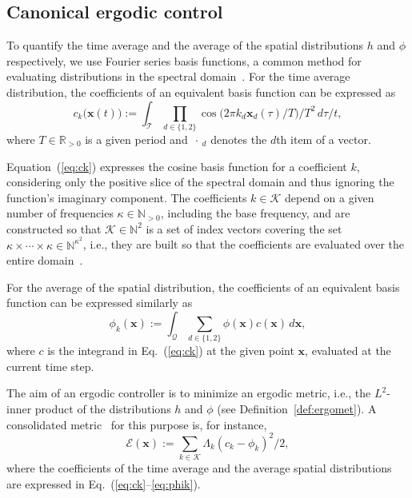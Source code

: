 \documentclass[letterpaper,10pt,conference,twoside]{IEEEtran}
\theoremstyle{definition}
\begin{document}
\subsection{Canonical ergodic control}
\label{sec:canon}
\noindent
To quantify the time average and the average of the spatial distributions $h$ and $\phi$ respectively, we use Fourier series basis functions, a common method for evaluating distributions in the spectral domain~\cite{mathew2011metrics}. For the time average distribution, the coefficients of an equivalent basis function can be expressed as
\begin{equation}\label{eq:ck}
  c_k\big(\mathbf{x}(t)\big):=\int_{\mathcal{T}}{\prod_{d\in\{1,2\}}}{\cos{\big(2\pi k_d\mathbf{x}_d(\tau)/T\big)}/T^2}\,d\tau/t,
\end{equation}
where $T\in\mathbb{R}_{>0}$ is a given period and $\,\cdot\,_d$ denotes the $d$th item of a vector.

Equation~(\ref{eq:ck}) expresses the cosine basis function for a coefficient $k$, considering only the positive slice of the spectral domain and thus ignoring the function's imaginary component. The coefficients $k\in\mathcal{K}$ depend on a given number of frequencies $\kappa\in\mathbb{N}_{>0}$, including the base frequency, and are constructed so that $\mathcal{K}\in\mathbb{N}^2$ is a set of index vectors covering the set $\kappa\times\cdots\times\kappa\in\mathbb{N}^{\kappa^2}$, i.e., they are built so that the coefficients are evaluated over the entire domain~\cite{calinon2020mixture}.

For the average of the spatial distribution, the coefficients of an equivalent basis function can be expressed similarly as 
\begin{equation}\label{eq:phik}
  \phi_k(\mathbf{x}):=\int_{\mathcal{Q}}{\sum_{d\in\{1,2\}}}{\phi(\mathbf{x})c(\mathbf{x})\,d\mathbf{x}},
\end{equation}
where $c$ is the integrand in Eq.~(\ref{eq:ck}) at the given point $\mathbf{x}$, evaluated at the current time step.

The aim of an ergodic controller is to minimize an ergodic metric, i.e., the $L^2$-inner product of the distributions $h$ and $\phi$ (see Definition~\ref{def:ergomet}). A consolidated metric~\cite{abraham2017ergodic,abraham2021ergodic,seewald2024energy,lerch2023safety,abraham2018decentralized,dong2023time} for this purpose is, for instance, \begin{equation}
  \mathcal{E}(\mathbf{x}):=\sum_{k\in\mathcal{K}}{\Lambda_k(c_k-\phi_k)^2/2},
\end{equation}
where the coefficients of the time average and the average spatial distributions are expressed in Eq.~(\ref{eq:ck}--\ref{eq:phik}).
\end{document}

